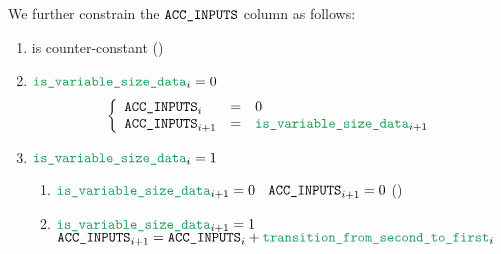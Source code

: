 We further constrain the $\texttt{ACC\_INPUTS}$ column as follows:
\begin{enumerate}
    \item \accInputs{} is counter-constant \quad (\trash)
    \item \If $\locIsVariableSizeData_{i} = 0$ ~\Then
        \[
            \left\{ \begin{array}{lcl}
                \accInputs_{i}     & = & 0                            \\
                \accInputs_{i + 1} & = & \locIsVariableSizeData_{i+1} \\
            \end{array} \right.
        \]
    \item \If $\locIsVariableSizeData_{i} = 1$ \Then 
        \begin{enumerate}
            \item \If $\locIsVariableSizeData _{i+1} = 0$ ~\Then $\texttt{ACC\_INPUTS}_{i+1} = 0$ \quad (\sanityCheck)
            \item \If $\locIsVariableSizeData _{i+1} = 1$ ~\Then $\accInputs_{i+1} = \accInputs_{i} + \locTransitionFromSecondToFirst_{i}$ 
        \end{enumerate}
\end{enumerate}